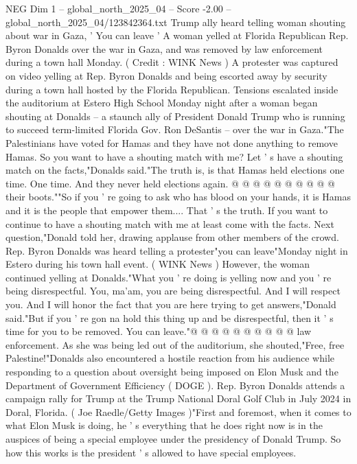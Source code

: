 \begin{textsample}{NEG Dim 1 – global\_north\_2025\_04 – Score -2.00 – global\_north\_2025\_04/123842364.txt}  \label{ex:f1_neg_099}
Trump ally heard telling woman shouting about war in Gaza, ' You can leave ' A woman yelled at Florida Republican Rep.
Byron Donalds over the war in Gaza, and was removed by law enforcement during a town hall Monday. ( Credit : WINK News ) A protester was captured on video yelling at Rep.
Byron Donalds and being escorted away by security during a town hall hosted by the Florida Republican.
Tensions escalated inside the auditorium at Estero High School Monday night after a woman began shouting at Donalds -- a staunch ally of President Donald Trump who is running to succeed term-limited Florida Gov.
Ron DeSantis -- over the war in Gaza."The Palestinians have voted for Hamas and they have not done anything to remove Hamas.
So you want to have a shouting match with me?
Let ' s have a shouting match on the facts,"Donalds said."The truth is, is that Hamas held elections one time.
One time.
And they never held elections again. @ @ @ @ @ @ @ @ @ @ their boots.""So if you ' re going to ask who has blood on your hands, it is Hamas and it is the people that empower them....
That ' s the truth.
If you want to continue to have a shouting match with me at least come with the facts.
Next question,"Donald told her, drawing applause from other members of the crowd.
Rep.
Byron Donalds was heard telling a protester"you can leave"Monday night in Estero during his town hall event. ( WINK News ) However, the woman continued yelling at Donalds."What you ' re doing is yelling now and you ' re being disrespectful.
You, ma'am, you are being disrespectful.
And I will respect you.
And I will honor the fact that you are here trying to get answers,"Donald said."But if you ' re gon na hold this thing up and be disrespectful, then it ' s time for you to be removed.
You can leave."@ @ @ @ @ @ @ @ @ @ law enforcement.
As she was being led out of the auditorium, she shouted,"Free, free Palestine!"Donalds also encountered a hostile reaction from his audience while responding to a question about oversight being imposed on Elon Musk and the Department of Government Efficiency ( DOGE ).
Rep.
Byron Donalds attends a campaign rally for Trump at the Trump National Doral Golf Club in July 2024 in Doral, Florida. ( Joe Raedle/Getty Images )"First and foremost, when it comes to what Elon Musk is doing, he ' s everything that he does right now is in the auspices of being a special employee under the presidency of Donald Trump.
So how this works is the president ' s allowed to have special employees.

\end{textsample}
